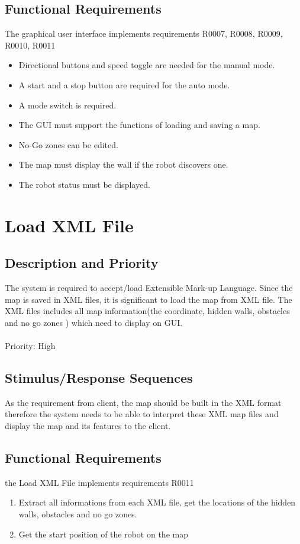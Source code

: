 \documentclass[11pt, a4paper]{report}
\begin{document}
\subsection{Functional Requirements}

The graphical user interface implements requirements R0007, R0008, R0009, R0010, R0011

\begin{itemize}
	\item Directional buttons and speed toggle are needed for the manual mode.
	\item A start and a stop button are required for the auto mode.
	\item A mode switch is required.
	\item The GUI must support the functions of loading and saving a map.
	\item No-Go zones can be edited.
	\item The map must display the wall if the robot discovers one.
	\item The robot status must be displayed.
\end{itemize}

\section{Load XML File}
\subsection{Description and Priority}
The system is required to accept/load Extensible Mark-up Language. Since the map is saved in XML files, it is significant to load the map from XML file. The XML files includes all map information(the coordinate, hidden walls, obstacles and no go zones ) which need to display on GUI.\\ \\
Priority: High
\subsection{Stimulus/Response Sequences}
As the requirement from client, the map should be built in the XML format therefore the system needs to be able to interpret these XML map files and display the map and its features to the client. 

\subsection{Functional Requirements}
the Load XML File implements requirements R0011
\begin{enumerate}
\item Extract all informations from each XML file, get the locations of the hidden walls, obstacles and no go zones.
\item Get the start position of the robot on the map  
\end{enumerate}
\end{document}
